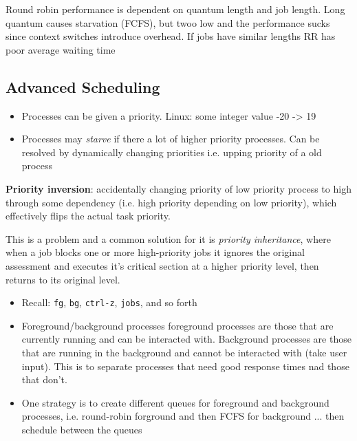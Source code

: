 \documentclass[../notes.tex]{subfiles}
\begin{document}
Round robin performance is dependent on quantum length and job length. Long quantum causes starvation (FCFS), but twoo low and the performance sucks since context switches introduce overhead. 
If jobs have similar lengths RR has poor average waiting time

\subsection{Advanced Scheduling}

\begin{itemize}
    \item Processes can be given a priority. Linux: some integer value -20 -> 19
    \item Processes may \textit{starve} if there a lot of higher priority processes. Can be resolved by dynamically changing priorities i.e. upping priority of a old process
\end{itemize}

\begin{definition}
    \textbf{Priority inversion}: accidentally changing priority of low priority process to high through some dependency (i.e. high priority depending on low priority), which effectively flips the actual task priority.

    This is a problem and a common solution for it is \textit{priority inheritance}, where when a job blocks one or more high-priority jobs it ignores the original assessment and executes it's critical section at a higher priority level, then returns to its original level.

\end{definition}


\begin{itemize}
    \item Recall: \texttt{fg}, \texttt{bg}, \texttt{ctrl-z}, \texttt{jobs}, and so forth
    \item Foreground/background processes foreground processes are those that are currently running and can be interacted with. Background processes are those that are running in the background and cannot be interacted with (take user input). This is to separate processes that need good response times nad those that don't.
    \item One strategy is to create different queues for foreground and background processes, i.e. round-robin forground and then FCFS for background ... then schedule between the queues
\end{itemize}
\end{document}
